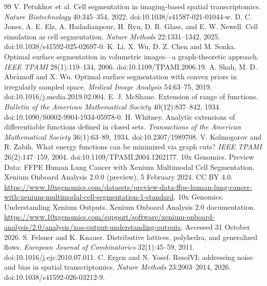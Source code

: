 \begin{thebibliography}{99}
 V. Petukhov et al. Cell segmentation in imaging-based spatial transcriptomics. \emph{Nature Biotechnology} 40:345--354, 2022. doi:10.1038/s41587-021-01044-w.
 D. C. Jones, A. E. Elz, A. Hadadianpour, H. Ryu, D. R. Glass, and E. W. Newell. Cell simulation as cell segmentation. \emph{Nature Methods} 22:1331--1342, 2025. doi:10.1038/s41592-025-02697-0.
 K. Li, X. Wu, D. Z. Chen and M. Sonka. Optimal surface segmentation in volumetric images---a graph-theoretic approach. \emph{IEEE TPAMI} 28(1):119--134, 2006. doi:10.1109/TPAMI.2006.19.
 A. Shah, M. D. Abr\`amoff and X. Wu. Optimal surface segmentation with convex priors in irregularly sampled space. \emph{Medical Image Analysis} 54:63--75, 2019. doi:10.1016/j.media.2019.02.004.
 E. J. McShane. Extension of range of functions. \emph{Bulletin of the American Mathematical Society} 40(12):837--842, 1934. doi:10.1090/S0002-9904-1934-05978-0.
 H. Whitney. Analytic extensions of differentiable functions defined in closed sets. \emph{Transactions of the American Mathematical Society} 36(1):63--89, 1934. doi:10.2307/1989708.
 V. Kolmogorov and R. Zabih. What energy functions can be minimized via graph cuts? \emph{IEEE TPAMI} 26(2):147--159, 2004. doi:10.1109/TPAMI.2004.1262177.
 10x Genomics. Preview Data: FFPE Human Lung Cancer with Xenium Multimodal Cell Segmentation. Xenium Onboard Analysis 2.0.0 (preview), 5 February 2024. CC BY 4.0. \url{https://www.10xgenomics.com/datasets/preview-data-ffpe-human-lung-cancer-with-xenium-multimodal-cell-segmentation-1-standard}.
 10x Genomics. Understanding Xenium Outputs. Xenium Onboard Analysis 2.0 documentation. \url{https://www.10xgenomics.com/support/software/xenium-onboard-analysis/2.0/analysis/xoa-output-understanding-outputs}. Accessed 31 October 2026.
 S. Felsner and K. Knauer. Distributive lattices, polyhedra, and generalized flows. \emph{European Journal of Combinatorics} 32(1):45--59, 2011. doi:10.1016/j.ejc.2010.07.011.
 C. Ergen and N. Yosef. ResolVI: addressing noise and bias in spatial transcriptomics. \emph{Nature Methods} 23:2003--2014, 2026. doi:10.1038/s41592-026-03212-9.


\end{thebibliography}
